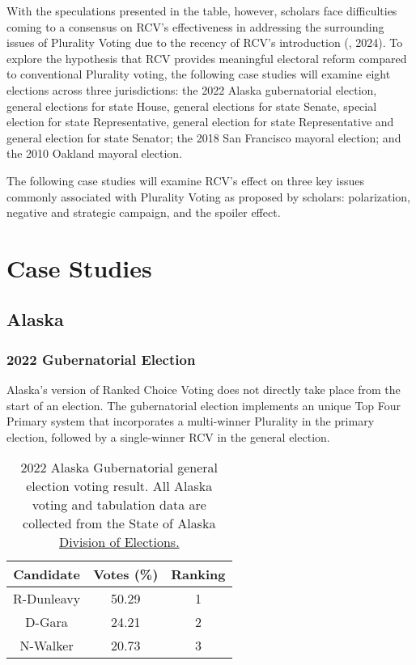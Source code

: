 \documentclass[12pt, a4paper, twoside]{article}
\begin{document}
With the speculations presented in the table, however, scholars face difficulties coming to a consensus on RCV’s effectiveness in addressing the surrounding issues of Plurality Voting due to the recency of RCV’s introduction (\cite{dowling2024}, 2024). To explore the hypothesis that RCV provides meaningful electoral reform compared to conventional Plurality voting, the following case studies will examine eight elections across three jurisdictions: the 2022 Alaska gubernatorial election, general elections for state House, general elections for state Senate, special election for state Representative, general election for state Representative and general election for state Senator; the 2018 San Francisco mayoral election; and the 2010 Oakland mayoral election. 

The following case studies will examine RCV’s effect on three key issues commonly associated with Plurality Voting as proposed by scholars: polarization, negative and strategic campaign, and the spoiler effect. 

\section{Case Studies}

\subsection{Alaska}

\subsubsection{2022 Gubernatorial Election}

Alaska's version of Ranked Choice Voting does not directly take place from the start of an election. The gubernatorial election implements an unique Top Four Primary system that incorporates a multi-winner Plurality in the primary election, followed by a single-winner RCV in the general election. 

\begin{table}[h!]
\centering
\begin{tabular}{|c | c | c |}
\hline
Candidate & Votes (\%) & Ranking \\ \hline
R-Dunleavy & 50.29 & 1 \\ \hline
D-Gara & 24.21 & 2 \\ \hline
N-Walker & 20.73 & 3 \\ \hline
\end{tabular}
\caption{2022 Alaska Gubernatorial general election voting result. All Alaska voting and tabulation data are collected from the State of Alaska \href{https://www.elections.alaska.gov/election-results/e/?id=22genr}{Division of Elections.}}
\label{tab:1}
\end{table}
\end{document}
